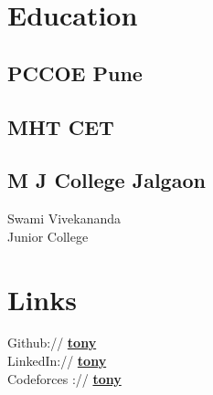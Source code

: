 \documentclass[]{deedy-resume-openfont}
\begin{document}
%
%
\lastupdated

%
%

%
%

\begin{minipage}[t]{0.33\textwidth} 


\section{Education} 

\subsection{PCCOE Pune}
\sectionsep

\subsection{MHT CET}
\sectionsep

\subsection{M J College Jalgaon}
Swami Vivekananda \\
Junior College\\

\sectionsep


\section{Links} 
Github:// \href{https://github.com/gittonyp}{\bf tony} \\
LinkedIn://  \href{ https://www.linkedin.com/in/gittonyp}{\bf tony} \\
Codeforces ://  \href{https://codeforces.com/profile/devtony}{\bf tony} \\


\end{minipage}
\end{document}
